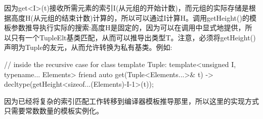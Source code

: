 因为get<I>(t)接收所需元素的索引I(从元组的开始计数)，而元组的实际存储是根据高度H(从元组的结束计数)计算的，所以可以通过I计算H。调用getHeight()的模板参数推导执行实际的搜索:高度H是固定的，因为可以在调用中显式地提供，所以只有一个TupleElt基类匹配，从而可以推导出类型T。注意，必须将getHeight()声明为Tuple的友元，从而允许转换为私有基类。例如:

\begin{cpp}
// inside the recursive case for class template Tuple:
template<unsigned I, typename... Elements>
friend auto get(Tuple<Elements...>& t)
	-> decltype(getHeight<sizeof...(Elements)-I-1>(t));
\end{cpp}

因为已经将复杂的索引匹配工作转移到编译器模板推导那里，所以这里的实现方式只需要常数数量的模板实例化。









